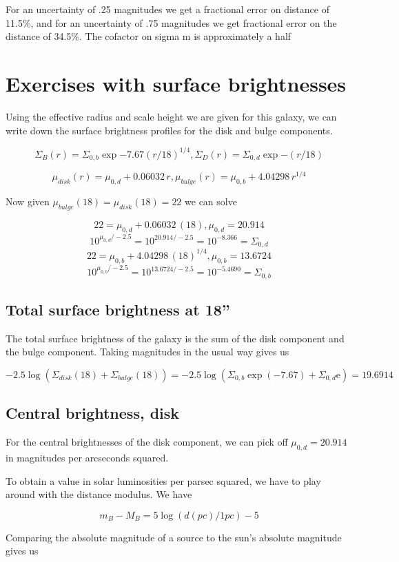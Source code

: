 \documentclass[12pt]{article}
\begin{document}
For an uncertainty of .25 magnitudes we get a fractional error on distance of 11.5\%, and for an uncertainty of .75 magnitudes we get fractional error on the distance of 34.5\%. The cofactor on sigma m is approximately a half
\section{Exercises with surface brightnesses}
Using the effective radius and scale height we are given for this galaxy, we can write down the surface brightness profiles for the disk and bulge components. 

$$ \Sigma_{B}(r) = \Sigma_{0,b} \exp{-7.67(r/18)^{1/4}},  \Sigma_{D}(r) = \Sigma_{0,d} \exp{-(r/18)} $$

$$ \mu_{disk}(r) =  \mu_{0,d} + 0.06032\, r, \mu_{bulge}(r) =  \mu_{0,b} + 4.04298 \, r^{1/4} $$

Now given $\mu_{bulge}(18) = \mu_{disk}(18) = 22$ we can solve

$$ 22 =  \mu_{0,d} + 0.06032\, (18),  \mu_{0,d} = 20.914$$
$$ 10^{\mu_{0,d}/-2.5} = 10^{20.914/-2.5} =  10^{-8.366}= \Sigma_{0,d} $$
$$ 22 = \mu_{0,b} + 4.04298 \, (18)^{1/4}, \mu_{0,b} = 13.6724  $$
$$ 10^{\mu_{0,b}/-2.5} = 10^{13.6724/-2.5} =  10^{-5.4690}= \Sigma_{0,b}$$

\subsection{Total surface brightness at 18''}
The total surface brightness of the galaxy is the sum of the disk component and the bulge component. Taking magnitudes in the usual way gives us

$$ -2.5\log(\Sigma_{disk}(18) + \Sigma_{bulge}(18)) = -2.5\log(\Sigma_{0,b} \exp(-7.67) + \Sigma_{0,d} \mathrm{e}) = 19.6914 $$

\subsection{Central brightness, disk}
For the central brightnesses of the disk component, we can pick off $\mu_{0,d} = 20.914$ in magnitudes per arcseconds squared. 

To obtain a value in solar luminosities per parsec squared, we have to play around with the distance modulus. We have

$$ m_{B} - M_{B} = 5\log(d(pc)/1pc) - 5 $$

Comparing the absolute magnitude of a source to the sun's absolute magnitude gives us
\end{document}
